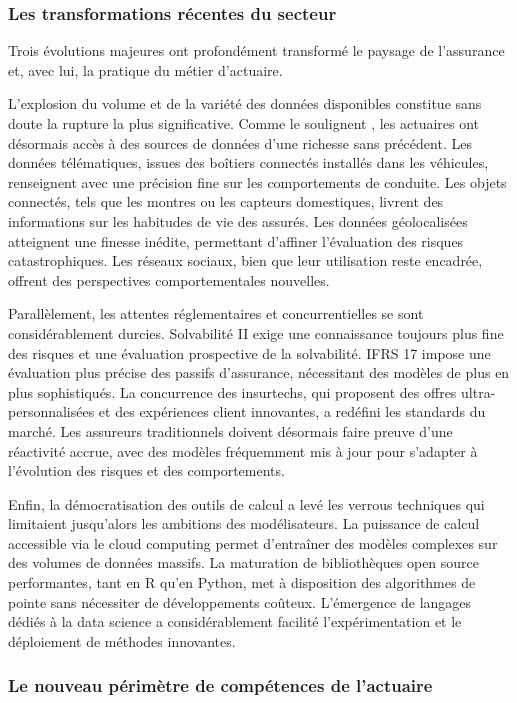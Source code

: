 \documentclass[
  french,
]{book}
\theoremstyle{definition}
\theoremstyle{definition}
\theoremstyle{definition}
\theoremstyle{definition}
\theoremstyle{remark}
\begin{document}
\subsubsection{Les transformations récentes du secteur}

Trois évolutions majeures ont profondément transformé le paysage de l'assurance et, avec lui, la pratique du métier d'actuaire.

L'explosion du volume et de la variété des données disponibles constitue sans doute la rupture la plus significative. Comme le soulignent \citet{henckaerts2021boosting}, les actuaires ont désormais accès à des sources de données d'une richesse sans précédent. Les données télématiques, issues des boîtiers connectés installés dans les véhicules, renseignent avec une précision fine sur les comportements de conduite. Les objets connectés, tels que les montres ou les capteurs domestiques, livrent des informations sur les habitudes de vie des assurés. Les données géolocalisées atteignent une finesse inédite, permettant d'affiner l'évaluation des risques catastrophiques. Les réseaux sociaux, bien que leur utilisation reste encadrée, offrent des perspectives comportementales nouvelles.

Parallèlement, les attentes réglementaires et concurrentielles se sont considérablement durcies. Solvabilité II exige une connaissance toujours plus fine des risques et une évaluation prospective de la solvabilité. IFRS 17 impose une évaluation plus précise des passifs d'assurance, nécessitant des modèles de plus en plus sophistiqués. La concurrence des insurtechs, qui proposent des offres ultra-personnalisées et des expériences client innovantes, a redéfini les standards du marché. Les assureurs traditionnels doivent désormais faire preuve d'une réactivité accrue, avec des modèles fréquemment mis à jour pour s'adapter à l'évolution des risques et des comportements.

Enfin, la démocratisation des outils de calcul a levé les verrous techniques qui limitaient jusqu'alors les ambitions des modélisateurs. La puissance de calcul accessible via le cloud computing permet d'entraîner des modèles complexes sur des volumes de données massifs. La maturation de bibliothèques open source performantes, tant en R qu'en Python, met à disposition des algorithmes de pointe sans nécessiter de développements coûteux. L'émergence de langages dédiés à la data science a considérablement facilité l'expérimentation et le déploiement de méthodes innovantes.

\subsubsection{Le nouveau périmètre de compétences de l'actuaire}
\end{document}
